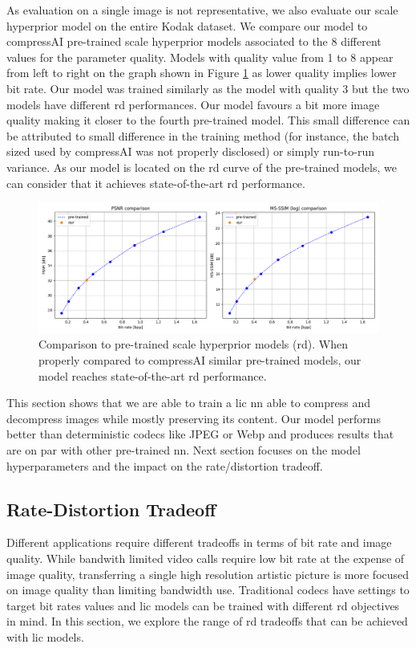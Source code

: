 As evaluation on a single image is not representative, we also evaluate our scale hyperprior model on the entire Kodak dataset. We compare our model to compressAI pre-trained scale hyperprior models associated to the 8 different values for the parameter \textsf{quality}. Models with \textsf{quality} value from 1 to 8 appear from left to right on the graph shown in Figure \ref{balle_repro_6} as lower quality implies lower bit rate. Our model was trained similarly as the model with \textsf{quality} 3 but the two models have different \acrshort{rd} performances. Our model favours a bit more image quality making it closer to the fourth pre-trained model. This small difference can be attributed to small difference in the training method (for instance, the batch sized used by compressAI was not properly disclosed) or simply run-to-run variance. As our model is located on the \acrshort{rd} curve of the pre-trained models, we can consider that it achieves state-of-the-art \acrshort{rd} performance. 

\begin{figure}
    \centering
    \includegraphics[width=15cm]{img/balle_repro_rd_2.png}
    \caption[Comparison to pre-trained scale hyperprior models  (\acrlong{rd}).]{Comparison to pre-trained scale hyperprior models  (\acrlong{rd}). When properly compared to compressAI similar pre-trained models, our model reaches state-of-the-art \acrshort{rd} performance.}
    \label{balle_repro_6}
\end{figure}

This section shows that we are able to train a \acrshort{lic} \acrshort{nn} able to compress and decompress images while mostly preserving its content. Our model performs better than deterministic codecs like JPEG or Webp and produces results that are on par with other pre-trained \acrshort{nn}. Next section focuses on the model hyperparameters and the impact on the rate/distortion tradeoff.

\subsection{Rate-Distortion Tradeoff}
Different applications require different tradeoffs in terms of bit rate and image quality. While bandwith limited video calls require low bit rate at the expense of image quality, transferring a single high resolution artistic picture is more focused on image quality than limiting bandwidth use. Traditional codecs have settings to target bit rates values and \acrshort{lic} models can be trained with different \acrshort{rd} objectives in mind. In this section, we explore the range of \acrshort{rd} tradeoffs that can be achieved with \acrshort{lic} models.

